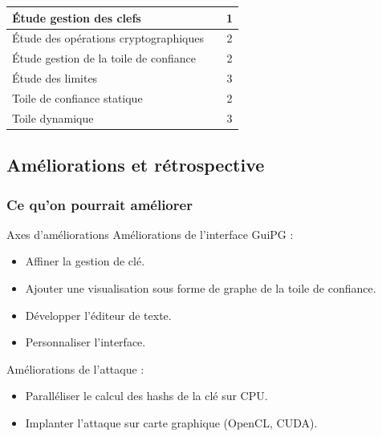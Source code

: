 \begin{frame}
\begin{tabular}{|l|l|l|}
    \hline
    \cellcolor{white}\color{red}\'{E}tude gestion des clefs & \multicolumn{1}{|c|}{\cellcolor{white}\color{black}} & \multicolumn{1}{|c|}{\cellcolor{white}\color{black}1} \\
    \hline
    \cellcolor{white}\color{red}\'{E}tude des opérations cryptographiques & \multicolumn{1}{|c|}{\cellcolor{white}\color{black}} & \multicolumn{1}{|c|}{\cellcolor{white}\color{black}2} \\
    \hline
    \cellcolor{white}\color{red}\'{E}tude gestion de la toile de confiance & \multicolumn{1}{|c|}{\cellcolor{white}\color{black}} & \multicolumn{1}{|c|}{\cellcolor{white}\color{black}2} \\
    \hline
    \cellcolor{white}\color{red}\'{E}tude des limites & \multicolumn{1}{|c|}{\cellcolor{white}\color{black}} & \multicolumn{1}{|c|}{\cellcolor{white}\color{black}3} \\
    \hline
    \cellcolor{white}\color{red}Toile de confiance statique & \multicolumn{1}{|c|}{\cellcolor{white}\color{black}} & \multicolumn{1}{|c|}{\cellcolor{white}\color{black}2} \\
    \hline
    \cellcolor{white}\color{red}Toile dynamique & \multicolumn{1}{|c|}{\cellcolor{white}\color{black}} & \multicolumn{1}{|c|}{\cellcolor{white}\color{black}3} \\
    \hline
  \end{tabular}
\end{frame}

\subsection{Améliorations et rétrospective}
  \begin{frame}
    \frametitle{\color{white}Ce qu'on pourrait améliorer}
    \begin{block}{Axes d'améliorations}
      Améliorations de l'interface GuiPG :
      \begin{itemize}
        \item Affiner la gestion de clé.
        \item Ajouter une visualisation sous forme de graphe de la toile de confiance.
        \item Développer l'éditeur de texte.
        \item Personnaliser l'interface.
      \end{itemize}
      Améliorations de l'attaque :
      \begin{itemize}
        \item Paralléliser le calcul des hashs de la clé sur CPU.
        \item Implanter l'attaque sur carte graphique (OpenCL, CUDA).
      \end{itemize}
    \end{block}
    
  \end{frame}

